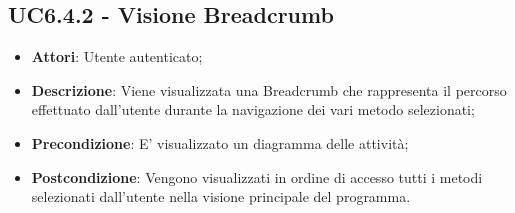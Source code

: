 \subsection{UC6.4.2 - Visione Breadcrumb} 
\label{ssec:UC6.4.2} 
\begin{itemize} 
\item \textbf{Attori}: Utente autenticato;
\item \textbf{Descrizione}: Viene visualizzata una Breadcrumb che rappresenta il percorso effettuato dall'utente durante la navigazione dei vari metodo selezionati;
\item \textbf{Precondizione}: E' visualizzato un diagramma delle attività;
\item \textbf{Postcondizione}: Vengono visualizzati in ordine di accesso tutti i metodi selezionati dall'utente nella visione principale del programma.
\end{itemize} 

